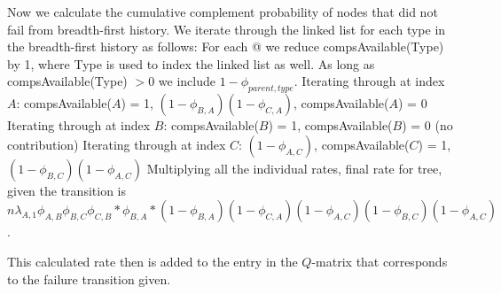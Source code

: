 \documentclass{article}
\begin{document}
Now we calculate the cumulative complement probability of nodes that did not fail from breadth-first history.
We iterate through the linked list for each type in the breadth-first history as follows:
For each @ we reduce compsAvailable(Type) by 1, where Type is used to index the linked list as well. As long as compsAvailable(Type) $ > 0$ we include $1 - \phi_{parent, type}$.
Iterating through at index $A$: compsAvailable($A$) = 1, $ (1 - \phi_{B, A}) (1 - \phi_{C, A}) $, compsAvailable($A$) = 0
Iterating through at index $B$: compsAvailable($B$) = 1, compsAvailable($B$) = 0 (no contribution)
Iterating through at index $C$: $ (1 - \phi_{A, C}) $, compsAvailable($C$) = 1, $ (1 - \phi_{B, C}) (1 - \phi_{A, C}) $
Multiplying all the individual rates, final rate for tree, given the transition is $ n \lambda_{A, 1} \phi_{A, B} \phi_{B, C} \phi_{C, B} * \phi_{B, A} * (1 - \phi_{B, A}) (1 - \phi_{C, A}) (1 - \phi_{A, C}) (1 - \phi_{B, C}) (1 - \phi_{A, C}) $.

This calculated rate then is added to the entry in the $Q$-matrix that corresponds to the failure transition given.
\end{document}
